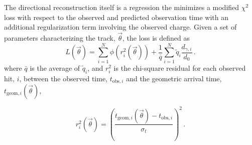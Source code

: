 The directional reconstruction itself is a regression the minimizes a modified $\chi^2$ loss with respect to the observed and predicted observation time with an additional regularization term involving the observed charge. Given a set of parameters characterizing the track, $\vec{\theta}$, the loss is defined as
\begin{equation}
L(\vec{\theta})=\sum_{i=1}^{N}\phi(r^2_i(\vec{\theta}))
+
\frac{1}{\bar{q}}\sum_{i=1}^{N}\tilde{q}_i \frac{d_{\gamma,i}}{d_0}\,.\label{eq:chi-square-mod-loss}
\end{equation}
where $\bar{q}$ is the average of $\tilde{q}_i$, and $r^2_i$ is the chi-square residual for each observed hit, $i$, between the observed time, $t_{\mathrm{obs}, i}$ and the geometric arrival time, $t_{\mathrm{geom},i}(\vec{\theta})$,

\begin{equation}
r_{i}^{2}(\vec{\theta})=\left(\frac{t_{\mathrm{geom},i}(\vec{\theta})-t_{\mathrm{obs},i}}{\sigma_{t}}\right)^{2}\,.
\end{equation}

